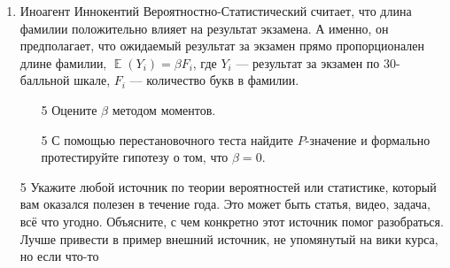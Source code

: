 \documentclass[12pt]{article} %
\DeclareMathOperator{\E}{\mathbb{E}}
\begin{document}
\begin{enumerate}
    \item Иноагент Иннокентий Вероятностно-Статистический считает, что длина фамилии положительно влияет 
    на результат экзамена. 
    А именно, он предполагает, что ожидаемый результат за экзамен прямо пропорционален длине фамилии,
    $\E(Y_i) = \beta F_i$, где $Y_i$ — результат за экзамен по 30-балльной шкале, 
    $F_i$ — количество букв в фамилии. 

    \begin{enumerate}
      \item [5] Оцените $\beta$ методом моментов. 
      \item [5] С помощью перестановочного теста найдите $P$-значение и формально протестируйте гипотезу о том, что $\beta = 0$.
    \end{enumerate}




    \item [5] Укажите любой источник по теории вероятностей или статистике, который вам оказался полезен 
    в течение года. 
    Это может быть статья, видео, задача, всё что угодно. Объясните, с чем конкретно этот источник помог 
    разобраться. Лучше привести в пример внешний источник, не упомянутый на вики курса, но если что-то 
    
    

\end{enumerate}
\end{document}
